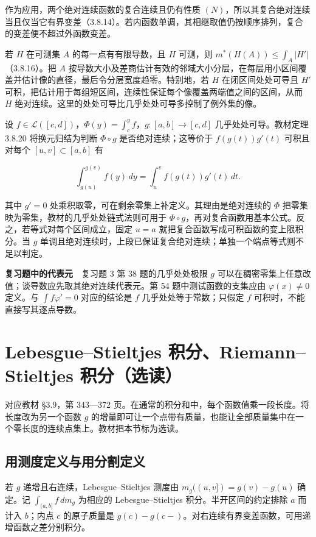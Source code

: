 \documentclass[11pt,a4paper]{article}
\begin{document}
作为应用，两个绝对连续函数的复合连续且仍有性质 \((N)\)，所以其复合绝对连续当且仅当它有界变差（3.8.14）。若内函数单调，其相继取值仍按顺序排列，复合的变差便不超过外函数变差。

若 \(H\) 在可测集 \(A\) 的每一点有有限导数，且 \(H\) 可测，则 \(m^*(H(A))\le\int_A|H'|\)（3.8.16）。把 \(A\) 按导数大小及差商估计有效的邻域大小分层，在每层用小区间覆盖并估计像的直径，最后令分层宽度趋零。特别地，若 \(H\) 在闭区间处处可导且 \(H'\) 可积，把估计用于每组短区间，连续性保证每个像覆盖两端值之间的区间，从而 \(H\) 绝对连续。这里的处处可导比几乎处处可导多控制了例外集的像。

设 \(f\in\mathcal L([c,d])\)，\(\Phi(y)=\int_c^y f\)，\(g:[a,b]\to[c,d]\) 几乎处处可导。教材定理 3.8.20 将换元归结为判断 \(\Phi\circ g\) 是否绝对连续；这等价于 \(f(g(t))g'(t)\) 可积且对每个 \([u,v]\subset[a,b]\) 有

\[
\int_{g(u)}^{g(v)} f(y)\,dy=\int_u^v f(g(t))g'(t)\,dt .
\]

其中 \(g'=0\) 处乘积取零，可在剩余零集上补定义。其理由是绝对连续的 \(\Phi\) 把零集映为零集，教材的几乎处处链式法则可用于 \(\Phi\circ g\)，再对复合函数用基本公式。反之，若等式对每个区间成立，固定 \(u=a\) 就把复合函数写成可积函数的变上限积分。当 \(g\) 单调且绝对连续时，上段已保证复合绝对连续；单独一个端点等式则不足以判定。

\textbf{复习题中的代表元}　复习题 3 第 38 题的几乎处处极限 \(g\) 可以在稠密零集上任意改值；谈导数应先取其绝对连续代表元。第 54 题中测试函数的支集应由 \(\varphi(x)\ne0\) 定义。与 \(\int f\varphi'=0\) 对应的结论是 \(f\) 几乎处处等于常数；只假定 \(f\) 可积时，不能直接写其逐点导数。

\section{Lebesgue–Stieltjes 积分、Riemann–Stieltjes 积分（选读）}
对应教材 §3.9，第 343---372 页。在通常的积分和中，每个函数值乘一段长度。将长度改为另一个函数 \(g\) 的增量即可让一个点带有质量，也能让全部质量集中在一个零长度的连续点集上。教材把本节标为选读。

\subsection*{用测度定义与用分割定义}\label{ux7528ux6d4bux5ea6ux5b9aux4e49ux4e0eux7528ux5206ux5272ux5b9aux4e49}

若 \(g\) 递增且右连续，Lebesgue--Stieltjes 测度由 \(m_g((u,v])=g(v)-g(u)\) 确定。记 \(\int_{(a,b]} f\,dm_g\) 为相应的 Lebesgue--Stieltjes 积分。半开区间的约定排除 \(a\) 而计入 \(b\)；内点 \(c\) 的原子质量是 \(g(c)-g(c-)\)。对右连续有界变差函数，可用递增函数之差分别积分。
\end{document}
